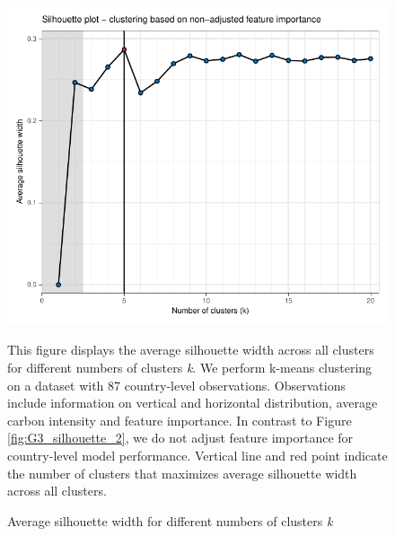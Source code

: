 \documentclass[12pt, a4paper]{article}
\newenvironment{subcaption}
{\strut
\vspace{-5pt}
\begin{minipage}[b]{0.9\textwidth}
  \hspace*{-\parindent}
  \footnotesize}
 {\end{minipage}}
\begin{document}
\begin{figure}[ht!]
   \centering
   \caption{Average silhouette width for different numbers of clusters \textit{k}} \label{fig:G1_silhouette}
   \includegraphics{Figures_Appendix/Figure_Silhouette_1}
   \begin{subcaption}
     This figure displays the average silhouette width across all clusters for different numbers of clusters \textit{k}. We perform k-means clustering on a dataset with 87 country-level observations. Observations include information on vertical and horizontal distribution, average carbon intensity and feature importance. In contrast to Figure \ref{fig:G3_silhouette_2}, we do not adjust feature importance for country-level model performance. Vertical line and red point indicate the number of clusters that maximizes average silhouette width across all clusters.
   \end{subcaption}
 \end{figure}

 \clearpage
\end{document}
